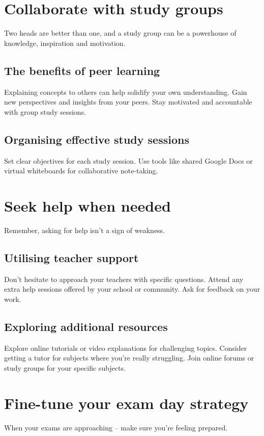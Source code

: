 \documentclass[a4paper]{article}
\begin{document}
\section{Collaborate with study groups}
Two heads are better than one, and a study group can be a powerhouse of knowledge, inspiration and motivation.

\subsection{The benefits of peer learning}
Explaining concepts to others can help solidify your own understanding.
Gain new perspectives and insights from your peers.
Stay motivated and accountable with group study sessions.
\subsection{Organising effective study sessions}
Set clear objectives for each study session.
Use tools like shared Google Docs or virtual whiteboards for collaborative note-taking.\\

\section{Seek help when needed}
Remember, asking for help isn't a sign of weakness.

\subsection{Utilising teacher support}
Don't hesitate to approach your teachers with specific questions.
Attend any extra help sessions offered by your school or community.
Ask for feedback on your work.

\subsection{Exploring additional resources}
Explore online tutorials or video explanations for challenging topics.
Consider getting a tutor for subjects where you're really struggling.
Join online forums or study groups for your specific subjects.\\

\section{Fine-tune your exam day strategy}
When your exams are approaching – make sure you're feeling prepared.
\end{document}
